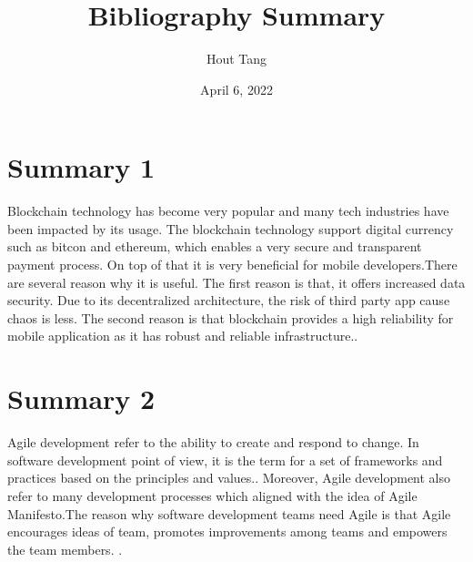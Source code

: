 \documentclass{article}
\title{Bibliography Summary}
\author{Hout Tang}
\date{April 6, 2022}
\begin{document}
\maketitle

\section*{Summary 1}
Blockchain technology has become very popular and many tech industries have been impacted by its usage\cite{BCArticle}. The blockchain technology support digital currency such as bitcon and ethereum, which enables a very secure and transparent payment process. On top of that it is very beneficial for mobile developers.There are several reason why it is useful. The first reason is that, it offers increased data security. Due to its decentralized architecture, the risk of third party app cause chaos is less. The second reason is that blockchain provides a high reliability for mobile application as it has robust and reliable infrastructure.\cite{BCArticle}.

 

\medskip

\section*{Summary 2}

Agile development refer to the ability to create and respond to change. In software development point of view, it is the term for a set of frameworks and practices based on the principles and values.\cite{AgileArticleg}. Moreover, Agile development also refer to many development processes which aligned with the idea of Agile Manifesto.The reason why software development teams need Agile is that Agile encourages ideas of team, promotes improvements among teams and empowers the team members. \cite{al2020agile}. 




\printbibliography
\end{document}
